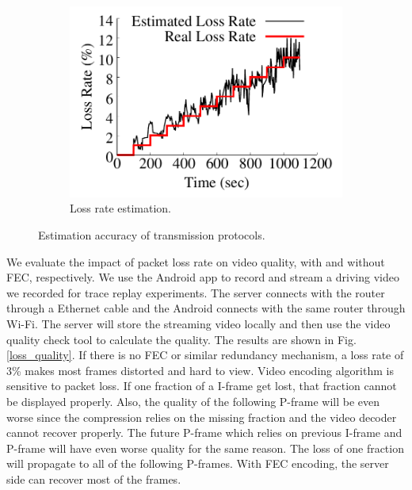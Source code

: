 \begin{figure}[ht]
\begin{subfigure}[t]{0.33\textwidth}
    \includegraphics[width=\linewidth]{Figs/RTDrive/evaluation/lossrate.pdf}
    \vspace{-0.5cm}
    \caption{Loss rate estimation.}
    \label{loss_rate}
  \end{subfigure}%
  \vspace{-0.3cm}
  \caption{Estimation accuracy of transmission protocols. }
  \label{feasibility}
  \vspace{-0.2cm}
\centering
\end{figure}



We evaluate the impact of packet loss rate on video quality, 
with and without FEC, respectively. 
We use the Android app to record and stream a driving video 
we recorded for trace replay experiments. 
The server connects with the router through a Ethernet 
cable and the Android connects with the same router
through Wi-Fi.  
The server will store the streaming video locally
and then use the video quality check tool 
to calculate the quality. 
The results are shown in Fig. \ref{loss_quality}. 
If there is no FEC or similar redundancy mechanism, 
a loss rate of 3\% makes most frames distorted and hard to view. 
Video encoding algorithm is sensitive to packet loss. 
If one fraction of a I-frame get lost, that fraction
cannot be displayed properly. 
Also, the quality of the following P-frame will be even worse 
since the compression relies on the missing fraction 
and the video decoder cannot recover properly. 
The future P-frame which relies on previous I-frame
and P-frame will have even worse quality for
the same reason. 
The loss of one fraction will propagate to all of the 
following P-frames.  
With FEC encoding, the server side can recover most of the 
frames. 


